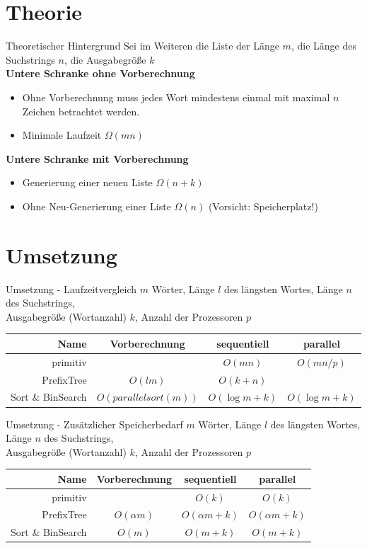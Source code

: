 \documentclass[11pt, xcolor=dvipsnames]{beamer}
\begin{document}
	\section{Theorie}
	\begin{frame}{Theoretischer Hintergrund}
	Sei im Weiteren die Liste der Länge $m$, die Länge des Suchstrings $n$, die Ausgabegröße $k$ \\ 
	
	
	\textbf{Untere Schranke ohne Vorberechnung}
		\begin{itemize}
			\item Ohne Vorberechnung muss  jedes Wort mindestens einmal mit maximal $n$ Zeichen betrachtet werden.
			\item Minimale Laufzeit $\Omega(mn)$
		\end{itemize}
		\textbf{Untere Schranke mit Vorberechnung}
		\begin{itemize}
			\item Generierung einer neuen Liste $\Omega(n+k)$ 
			\item Ohne Neu-Generierung einer Liste $\Omega(n)$ (Vorsicht: Speicherplatz!)	
		\end{itemize}
	\end{frame}
	\section{Umsetzung}
	\begin{frame}{Umsetzung - Laufzeitvergleich}
		$m$ Wörter, Länge $l$ des längsten Wortes, Länge $n$ des Suchstrings,\\Ausgabegröße (Wortanzahl) $k$, Anzahl der Prozessoren $p$
		
		\begin{center}
			\begin{tabular}{r|ccc}
		\textbf{Name}	&  Vorberechnung & sequentiell & parallel \\ 
		\hline
		primitiv	& &$O(mn)$ & $O(mn/p)$ \\ 
		PrefixTree	& $O(lm)$ & $O(k+n)$ & \\
		Sort \& BinSearch & $O(parallelsort(m))$ & $O(\log m + k)$ & $O(\log m + k)$
		\end{tabular}
		\end{center} 
	\end{frame}
	
	\begin{frame}{Umsetzung - Zusätzlicher Speicherbedarf}
		$m$ Wörter, Länge $l$ des längsten Wortes, Länge $n$ des Suchstrings,\\Ausgabegröße (Wortanzahl) $k$, Anzahl der Prozessoren $p$
		\begin{center}
		\begin{tabular}{r|ccc}
			\textbf{Name}	&  Vorberechnung & sequentiell & parallel \\ 
			\hline
			primitiv	& &$ O(k)$ & $O(k)$ \\ 
			PrefixTree	& $O(\alpha m)$ & $O(\alpha m + k)$ & $O(\alpha m + k)$ \\
			Sort \& BinSearch & $O(m)$ & $O(m+k)$ & $O(m+k)$
		\end{tabular} 
		\end{center}
	\end{frame}
	
\end{document}

